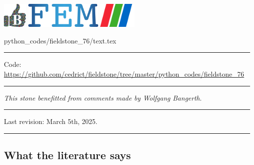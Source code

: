 \noindent
\includegraphics[height=1.25cm]{images/pictograms/benchmark}
\includegraphics[height=1.25cm]{images/pictograms/FEM}
\includegraphics[height=1.25cm]{images/pictograms/paraview}


\begin{flushright} {\tiny {\color{gray} python\_codes/fieldstone\_76/text.tex}} \end{flushright}


\par\noindent\rule{\textwidth}{0.4pt}

\begin{center}
\inpython \hspace{0.5cm}
{\small Code: \url{https://github.com/cedrict/fieldstone/tree/master/python_codes/fieldstone_76}}
\end{center}

\par\noindent\rule{\textwidth}{0.4pt}

{\sl This stone benefitted from comments made by Wolfgang Bangerth}. %

\par\noindent\rule{\textwidth}{0.4pt}

Last revision: March 5th, 2025.

\par\noindent\rule{\textwidth}{0.4pt}


\subsection*{What the literature says}

